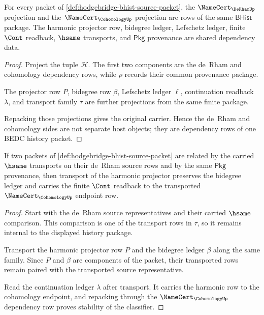 \begin{theorem}
\label{thm:hodgebridge-source-dependency-surface}
For every packet of \autoref{def:hodgebridge-bhist-source-packet}, the $\NameCert_{\DeRhamUp}$ projection and the $\NameCert_{\CohomologyUp}$ projection are rows of the same $\mathsf{BHist}$ package. The harmonic projector row, bidegree ledger, Lefschetz ledger, finite $\Cont$ readback, $\hsame$ transports, and $\mathsf{Pkg}$ provenance are shared dependency data.
\end{theorem}
\begin{proof}
Project the tuple $\mathcal{H}$. The first two components are the de~Rham and cohomology dependency rows, while $\rho$ records their common provenance package.

The projector row $P$, bidegree row $\beta$, Lefschetz ledger $\ell$, continuation readback $\lambda$, and transport family $\tau$ are further projections from the same finite package.

Repacking those projections gives the original carrier. Hence the de~Rham and cohomology sides are not separate host objects; they are dependency rows of one BEDC history packet.
\end{proof}

\begin{theorem}
\label{thm:hodgebridge-harmonic-projector-classifier-stability}
If two packets of \autoref{def:hodgebridge-bhist-source-packet} are related by the carried $\hsame$ transports on their de~Rham source rows and by the same $\mathsf{Pkg}$ provenance, then transport of the harmonic projector preserves the bidegree ledger and carries the finite $\Cont$ readback to the transported $\NameCert_{\CohomologyUp}$ endpoint row.
\end{theorem}
\begin{proof}
Start with the de~Rham source representatives and their carried $\hsame$ comparison. This comparison is one of the transport rows in $\tau$, so it remains internal to the displayed history package.

Transport the harmonic projector row $P$ and the bidegree ledger $\beta$ along the same family. Since $P$ and $\beta$ are components of the packet, their transported rows remain paired with the transported source representative.

Read the continuation ledger $\lambda$ after transport. It carries the harmonic row to the cohomology endpoint, and repacking through the $\NameCert_{\CohomologyUp}$ dependency row proves stability of the classifier.
\end{proof}

